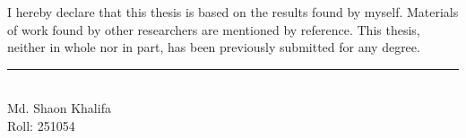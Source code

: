 I hereby declare that this thesis is based on the results found by myself. Materials of work found by other researchers are mentioned by reference. This thesis, neither in whole nor in part, has been previously submitted for any degree.

\vspace{1in}


\noindent   \rule{3.5cm}{1pt} \\
   Md. Shaon Khalifa \\
   Roll: 251054 \\
